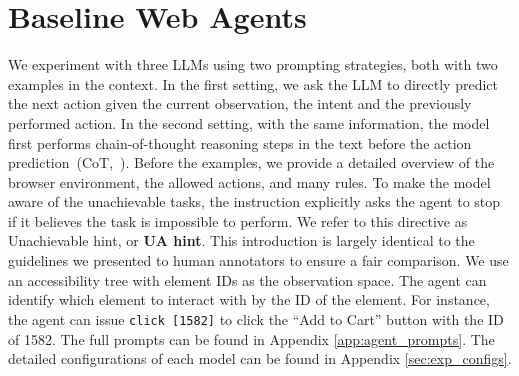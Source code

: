\section{Baseline Web Agents}\label{sec:baseline_agents}
We experiment with three LLMs using two prompting strategies, both with two examples in the context. In the first setting, we ask the LLM to directly predict the next action given the current observation, the intent and the previously performed action. 
In the second setting, with the same information, the model first performs chain-of-thought reasoning steps in the text before the action prediction~(CoT,~\citet{wei2022chain, yao2022react}). 
Before the examples, we provide a detailed overview of the browser environment, the allowed actions, and many rules.
To make the model aware of the unachievable tasks, the instruction explicitly asks the agent to stop if it believes the task is impossible to perform. We refer to this directive as Unachievable hint, or \textbf{UA hint}.
This introduction is largely identical to the guidelines we presented to human annotators to ensure a fair comparison.
We use an accessibility tree with element IDs as the observation space.
The agent can identify which element to interact with by the ID of the element. For instance, the agent can issue \texttt{click [1582]} to click the ``Add to Cart'' button with the ID of 1582.
The full prompts can be found in Appendix \ref{app:agent_prompts}.
The detailed configurations of each model can be found in Appendix \ref{sec:exp_configs}.

